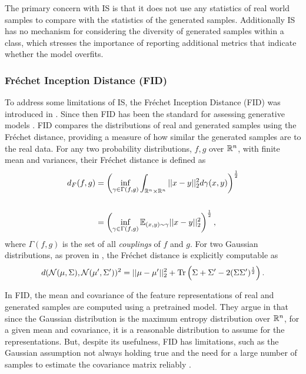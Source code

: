 \documentclass[../../thesis.tex]{subfiles}
\begin{document}
The primary concern with IS is that it does not use any statistics of real world samples to compare with the statistics of the generated samples. Additionally IS has no mechanism for considering the diversity of generated samples within a class, which stresses the importance of reporting additional metrics that indicate whether the model overfits. 

\subsubsection{Fréchet Inception Distance (FID)}
To address some limitations of IS, the Fréchet Inception Distance (FID) was introduced in \cite{heusel2018gans}. Since then FID has been the standard for assessing generative models \cite{borji2021pros}. FID compares the distributions of real and generated samples using the Fréchet distance, providing a measure of how similar the generated samples are to the real data. For any two probability distributions, $f,g$ over $\mathbb{R}^n$, with finite mean and variances, their Fréchet distance is defined as 
\begin{equation}
    \begin{aligned}
        d_F(f,g) &= \left(\inf_{\gamma \in \Gamma(f,g)} \int_{\mathbb{R}^n\times\mathbb{R}^n}||x-y||_2^2d\gamma(x,y) \right)^{\frac{1}{2}}\\\\
            &= \left(\inf_{\gamma \in \Gamma(f,g)} \mathbb{E}_{(x,y)\sim \gamma} ||x-y||_2^2\right)^{\frac{1}{2}},
    \end{aligned}
\end{equation}
where $\Gamma(f,g)$ is the set of all \textit{couplings} of $f$ and $g$. For two Gaussian distributions, as proven in  \cite{DOWSON1982450}, the Fréchet distance is explicitly computable as
\begin{equation}
    \label{eq:FID Gaussian}
    d(\mathcal{N}(\mu,\Sigma),\mathcal{N}(\mu',\Sigma'))^2 = ||\mu-\mu'||_2^2 + \operatorname{Tr} \left( \Sigma + \Sigma' - 2(\Sigma\Sigma')^{\frac12}\right).
\end{equation}

In FID, the mean and covariance of the feature representations of real and generated samples are computed using a pretrained model. They argue in \cite{heusel2018gans} that since the Gaussian distribution is the maximum entropy distribution over $\mathbb{R}^n$, for a given mean and covariance, it is a reasonable distribution to assume for the representations. But, despite its usefulness, FID has limitations, such as the Gaussian assumption not always holding true and the need for a large number of samples to estimate the covariance matrix reliably \cite{jayasumana2024rethinking, chong2020effectively}.
\end{document}
